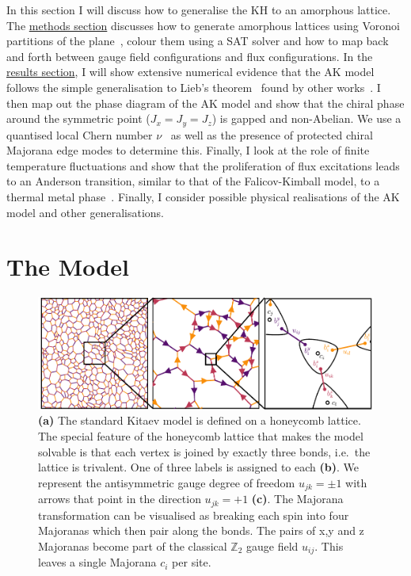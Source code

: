 In this section I will discuss how to generalise the KH to an amorphous lattice. The \protect\hyperlink{amk-methods}{methods section} discusses how to generate amorphous lattices using Voronoi partitions of the plane~\autocite{mitchellAmorphousTopologicalInsulators2018,marsalTopologicalWeaireThorpeModels2020}, colour them using a SAT solver and how to map back and forth between gauge field configurations and flux configurations. In the \protect\hyperlink{amk-results}{results section}, I will show extensive numerical evidence that the AK model follows the simple generalisation to Lieb's theorem~\autocite{lieb_flux_1994} found by other works~\autocite{eschmannThermodynamicClassificationThreedimensional2020,Yao2009,eschmann2019thermodynamics,Peri2020}. I then map out the phase diagram of the AK model and show that the chiral phase around the symmetric point (\(J_x = J_y = J_z\)) is gapped and non-Abelian. We use a quantised local Chern number \(\nu\)~\autocite{peru_preprint,mitchellAmorphousTopologicalInsulators2018} as well as the presence of protected chiral Majorana edge modes to determine this. Finally, I look at the role of finite temperature fluctuations and show that the proliferation of flux excitations leads to an Anderson transition, similar to that of the Falicov-Kimball model, to a thermal metal phase~\autocite{Laumann2012,lahtinenTopologicalLiquidNucleation2012,selfThermallyInducedMetallic2019}. Finally, I consider possible physical realisations of the AK model and other generalisations.

\hypertarget{amk-Model}{%
\section{The Model}\label{amk-Model}}

\hypertarget{fig:amk-zoom}{%
\begin{figure}
\centering
\includegraphics[width=1\textwidth,height=\textheight]{figure_code/amk_chapter/intro/amk_zoom/amk_zoom_by_hand}
\caption[{The Kitaev Honeycomb Model}]{\textbf{(a)} The standard Kitaev model is defined on a honeycomb lattice. The special feature of the honeycomb lattice that makes the model solvable is that each vertex is joined by exactly three bonds, i.e.~the lattice is trivalent. One of three labels is assigned to each \textbf{(b)}. We represent the antisymmetric gauge degree of freedom \(u_{jk} = \pm 1\) with arrows that point in the direction \(u_{jk} = +1\) \textbf{(c)}. The Majorana transformation can be visualised as breaking each spin into four Majoranas which then pair along the bonds. The pairs of x,y and z Majoranas become part of the classical \(\mathbb{Z}_2\) gauge field \(u_{ij}\). This leaves a single Majorana \(c_i\) per site.}
\label{fig:amk-zoom}
\end{figure}
}

